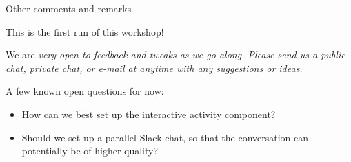 \documentclass[10pt]{beamer}
\begin{document}
\begin{frame}{Other comments and remarks}

This is the first run of this workshop!

\vfill
We are \it{very} open to feedback and tweaks as we go along.  Please send us a public chat, private chat, or e-mail at anytime with any suggestions or ideas.

\vfill
A few known open questions for now:
\begin{itemize}
\item How can we best set up the interactive activity component?
\item Should we set up a parallel Slack chat, so that the conversation can potentially be of higher quality?
\end{itemize}


\end{frame}
\end{document}

